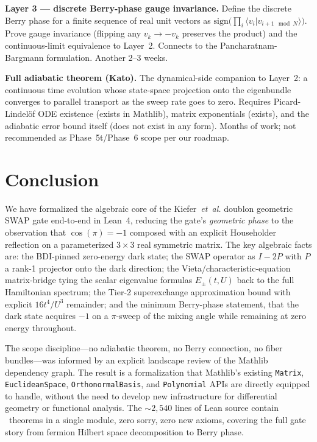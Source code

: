 \documentclass[aps,prd,twocolumn,showpacs,superscriptaddress,nofootinbib]{revtex4-2}
\begin{document}
\textbf{Layer 3 — discrete Berry-phase gauge invariance.} Define the
discrete Berry phase for a finite sequence of real unit vectors as
$\mathrm{sign}\bigl(\prod_i \langle v_i | v_{i+1\mod N}\rangle\bigr)$.
Prove gauge invariance (flipping any $v_k \to -v_k$ preserves the
product) and the continuous-limit equivalence to Layer~2. Connects to
the Pancharatnam-Bargmann formulation. Another 2--3 weeks.

\textbf{Full adiabatic theorem (Kato).} The dynamical-side companion
to Layer~2: a continuous time evolution whose state-space projection
onto the eigenbundle converges to parallel transport as the sweep
rate goes to zero. Requires Picard-Lindel\"of ODE existence
(exists in Mathlib), matrix exponentials (exists), and the adiabatic
error bound itself (does not exist in any form). Months of work;
not recommended as Phase~5t/Phase~6 scope per our roadmap.

\section{Conclusion}
\label{sec:conclusion}

We have formalized the algebraic core of the Kiefer~\textit{et~al.}
doublon geometric SWAP gate end-to-end in Lean~4, reducing the gate's
\emph{geometric phase} to the observation that $\cos(\pi) = -1$
composed with an explicit Householder reflection on a parameterized
$3\times 3$ real symmetric matrix. The key algebraic facts are:
the BDI-pinned zero-energy dark state; the SWAP operator as
$I - 2P$ with $P$ a rank-1 projector onto the dark direction; the
Vieta/characteristic-equation matrix-bridge tying the scalar
eigenvalue formulas $E_\pm(t, U)$ back to the full Hamiltonian
spectrum; the Tier-2 superexchange approximation bound with explicit
$16 t^4/U^3$ remainder; and the minimum Berry-phase statement, that
the dark state acquires $-1$ on a $\pi$-sweep of the mixing angle
while remaining at zero energy throughout.

The scope discipline---no adiabatic theorem, no Berry connection, no
fiber bundles---was informed by an explicit landscape review of the
Mathlib dependency graph. The result is a formalization that
Mathlib's existing \texttt{Matrix}, \texttt{EuclideanSpace},
\texttt{OrthonormalBasis}, and \texttt{Polynomial} APIs are directly
equipped to handle, without the need to develop new infrastructure
for differential geometry or functional analysis. The $\sim 2{,}540$
lines of Lean source contain \fhdTotal{}~theorems in a single module, zero
sorry, zero new axioms, covering the full gate story from fermion
Hilbert space decomposition to Berry phase.
\end{document}
